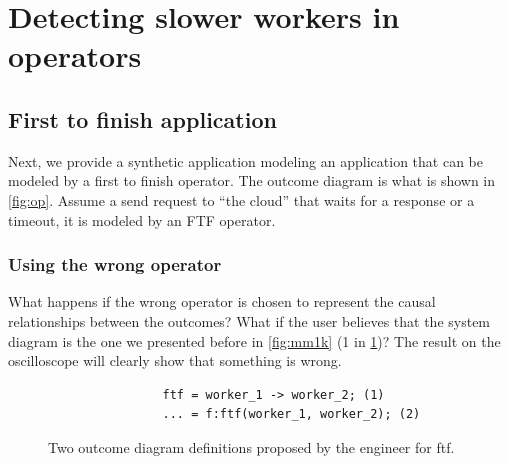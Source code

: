 \section{Detecting slower workers in operators}
    \subsection{First to finish application}
        Next, we provide a synthetic application modeling an application that can be modeled by a first to finish operator. The outcome diagram is what is shown in \cref{fig:op}. Assume a send request to ``the cloud'' that waits for a response or a timeout, it is modeled by an FTF operator. \cite{dq-tut}
       \subsubsection{Using the wrong operator}
            What happens if the wrong operator is chosen to represent the causal relationships between the outcomes? What if the user believes that the system diagram is the one we presented before in \cref{fig:mm1k} (1 in \cref{fig:wrong_od})? The result on the oscilloscope will clearly show that something is wrong.
            \begin{figure}[H]
            \begin{verbatim}
                ftf = worker_1 -> worker_2; (1)
                ... = f:ftf(worker_1, worker_2); (2)
            \end{verbatim}
            \caption{Two outcome diagram definitions proposed by the engineer for ftf.}
                \label{fig:wrong_od}
            \end{figure}

